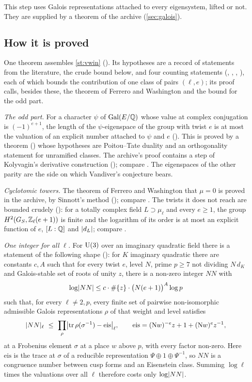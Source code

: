 This step uses Galois representations attached to every eigensystem, lifted or not. They are
supplied by a theorem of the archive (\cref{sec:galois}).

\subsection{How it is proved}
One theorem assembles \cref{st:vwin} \lvS{} (). Its hypotheses are a record
of statements from the literature, the crude bound  below, and four counting
statements (, , , ), each of which
bounds the contribution of one class of pairs $(\ell,e)$; its proof calls, besides these, the
theorem of Ferrero and Washington and the bound for the odd part.

\emph{The odd part.} For a character $\psi$ of $\operatorname{Gal}(E/\mathbb{Q})$ whose value at complex conjugation
is $(-1)^{e+1}$, the length of the $\psi$-eigenspace of the group with twist $e$ is at most the
valuation of an explicit number attached to $\psi$ and $e$ (). This is proved
by a theorem \lvS{} () whose hypotheses are Poitou--Tate duality and an
orthogonality statement for unramified classes. The archive's proof contains a step of
Kolyvagin's derivative construction (); compare
\cite{kolyvagin1990,rubin2000}. The eigenspaces of the other parity are the side on which
Vandiver's conjecture bears.

\emph{Cyclotomic towers.} The theorem of Ferrero and Washington
\cite{ferrerowashington1979} that $\mu=0$ is proved in the archive, by Sinnott's method
\cite{sinnott1984} \lvS{} (); compare \cite{iwasawa1973}. The twists it does not
reach are bounded crudely \lvS{} (): for a totally complex field
$L\supset\mu_\ell$ and every $e\ge1$, the group $H^2(G_S,\mathbb{Z}_\ell(e+1))$ is finite and the
logarithm of its order is at most an explicit function of $e$, $[L:\mathbb{Q}]$ and $\lvert d_L\rvert$;
compare \cite{soule1979,borel1974}.

\emph{One integer for all $\ell$.} For $\mathrm{U}(3)$ over an imaginary quadratic field there is a
statement of the following shape \lvS{}
(): for $K$ imaginary quadratic there are constants $c,A$ such
that for every twist $e$, level $N$, prime $p\ge7$ not dividing $N\,d_K$ and Galois-stable set
of roots of unity $z$, there is a non-zero integer $NN$ with
\[
\log\lvert NN\rvert\le c\cdot\#\{z\}\cdot\bigl(N(e+1)\bigr)^A\log p
\]
such that, for every $\ell\ne2,p$, every finite set of pairwise non-isomorphic admissible
Galois representations $\rho$ of that weight and level satisfies
\[
\abs{NN}_\ell\ \le\ \prod_{\rho}\bigl|\tr\rho(\sigma^{-1})-\mathrm{eis}\bigr|_\ell,
\qquad \mathrm{eis}=(\mathrm Nw)^{-e}z+1+(\mathrm Nw)^{e}z^{-1},
\]
at a Frobenius element $\sigma$ at a place $w$ above $p$, with every factor non-zero. Here $\mathrm{eis}$
is the trace at $\sigma$ of a reducible representation $\Psi\oplus1\oplus\Psi^{-1}$, so $NN$ is
a congruence number between cusp forms and an Eisenstein class. Summing $\log\ell$ times the
valuations over all $\ell$ therefore costs only $\log\lvert NN\rvert$.

